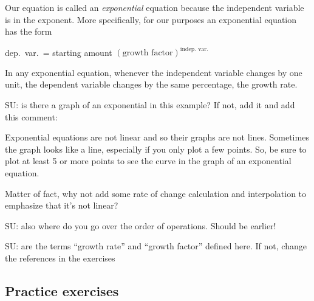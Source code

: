 
Our equation is called an \emph{exponential} equation because the independent variable is in the exponent.  More specifically, for our purposes an exponential equation has the form

\begin{center}
dep.\ var.\ = starting amount $\left(\text{growth factor}\right)^{\text{indep.\ var.\ }}$
\end{center}

In any exponential equation, whenever the independent variable changes by one unit, the dependent variable changes by the same percentage, the growth rate.

SU:  is there a graph of an exponential in this example?  If not, add it and add this comment:

Exponential equations are not linear and so their graphs are not lines.  Sometimes the graph looks like a  line, especially if you only plot a few points.  So, be sure to plot at least 5 or more points to see the curve in the graph of an exponential equation.

Matter of fact, why not add some rate of change calculation and interpolation to emphasize that it's not linear?

SU:  also where do you go over the order of operations.  Should be earlier!

SU:  are the terms ``growth rate'' and ``growth factor'' defined here.  If not, change the references in the exercises

\newpage
\subsection*{Practice exercises}

